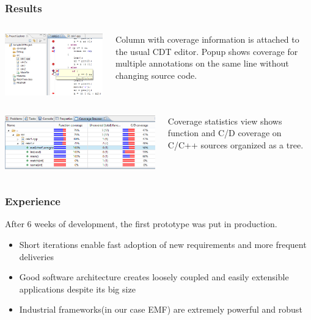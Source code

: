 \documentclass{beamer}
\begin{document}
\begin{frame}
  \frametitle{Results}
\begin{columns}[T]
\begin{column}{.6\textwidth}
    \includegraphics[scale=0.5]{plugin_source.png}
\end{column}
\begin{column}{.4\textwidth}
Column with coverage information is attached to the usual CDT editor. 
Popup shows coverage for multiple annotations on the same line without changing source code.
\end{column}
\end{columns}
\begin{columns}[T]
\begin{column}{.6\textwidth}
  \includegraphics[scale=0.4]{plugin_stat.png}
\end{column}
\begin{column}{.4\textwidth}
Coverage statistics view shows function and C/D coverage on C/C++ sources organized as a tree.
\end{column}
\end{columns}
\end{frame}

\begin{frame}
  \frametitle{Experience}
After 6 weeks of development, the first prototype was put in production.
\begin{itemize}
  \item Short iterations enable fast adoption of new requirements and more frequent deliveries
  \item Good software architecture creates loosely coupled and easily extensible applications despite its big size
  \item Industrial frameworks(in our case EMF) are extremely powerful and robust
\end{itemize}
\end{frame}
\end{document}
